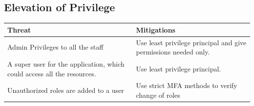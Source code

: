 \subsection{Elevation of Privilege}

\begingroup
\centering
\setlength{\tabcolsep}{6.5pt} %
\renewcommand{\arraystretch}{1.8} %
\begin{longtable}{ |p{7cm}| p{8cm} |}
\hline
\textbf{Threat} & \textbf{Mitigations} \\
\hline
Admin Privileges to all the staff & Use least privilege principal and give permissions needed only.
\\
\hline
A super user for the application, which could access all the resources. & Use least privilege principal.\\
\hline
Unauthorized roles are added to a user & Use strict MFA methods to verify change of roles
\hline
\end{longtable}
\endgroup


